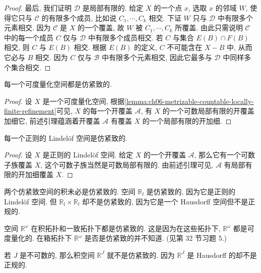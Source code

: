 \documentclass[../../main.tex]{subfiles}
\begin{document}
\begin{proof}
最后, 我们证明 $\mathcal{D}$ 是局部有限的. 给定 $X$ 的一个点 $x$, 选取 $x$ 的邻域 $W$, 使得它只与 $\mathcal{C}$ 的有限多个成员, 比如说 $C_1,\cdots,C_k$ 相交. 下证 $W$ 只与 $\mathcal{D}$ 中有限多个元素相交. 因为 $\mathcal{C}$ 是 $X$ 的一个覆盖, 故 $W$ 被 $C_1,\cdots,C_k$ 所覆盖. 由此只需说明 $\mathcal{C}$ 中的每一个成员 $C$ 仅与 $\mathcal{D}$ 中有限多个成员相交. 若 $C$ 与集合 $E(B)\cap F(B)$ 相交, 则 $C$ 与 $E(B)$ 相交. 根据 $E(B)$ 的定义, $C$ 不可能含在 $X-B$ 中, 从而它必与 $B$ 相交. 因为 $C$ 仅与 $\mathcal{B}$ 中有限多个元素相交, 因此它最多与 $\mathcal{D}$ 中同样多个集合相交.
\end{proof}

\begin{theorem}\label{theorem:ch06-metrizable-paracompact}
每一个可度量化空间都是仿紧致的.
\end{theorem}

\begin{proof}
设 $X$ 是一个可度量化空间, 根据\cref{lemma:ch06-metrizable-countable-locally-finite-refinement}可见, $X$ 的每一个开覆盖 $\mathcal{A}$, 有 $X$ 的一个可数局部有限的开覆盖加细它, 前述引理蕴涵着开覆盖 $\mathcal{A}$ 有覆盖 $X$ 的一个局部有限的开加细.
\end{proof}

\begin{theorem}\label{theorem:ch06-regular-lindelof-paracompact}
每一个正则的 Lindelöf 空间是仿紧致的.
\end{theorem}

\begin{proof}
设 $X$ 是正则的 Lindelöf 空间. 给定 $X$ 的一个开覆盖 $\mathcal{A}$, 那么它有一个可数子族覆盖 $X$, 这个可数子族当然是可数局部有限的. 由前述引理可见, $\mathcal{A}$ 有局部有限的开加细覆盖 $X$.
\end{proof}

\begin{examples}
两个仿紧致空间的积未必是仿紧致的. 空间 $\mathbb{R}_l$ 是仿紧致的, 因为它是正则的 Lindelöf 空间. 但 $\mathbb{R}_l\times\mathbb{R}_l$ 却不是仿紧致的, 因为它是一个 Hausdorff 空间但不是正规的.
\end{examples}

\begin{examples}
空间 $\mathbb{R}^\omega$ 在积拓扑和一致拓扑下都是仿紧致的. 这是因为在这些拓扑下, $\mathbb{R}^\omega$ 都是可度量化的. 在箱拓扑下 $\mathbb{R}^\omega$ 是否是仿紧致的并不知道. (见第 32 节习题 5.)
\end{examples}

\begin{examples}
若 $J$ 是不可数的, 那么积空间 $\mathbb{R}^J$ 就不是仿紧致的. 因为 $\mathbb{R}^J$ 是 Hausdorff 的却不是正规的.
\end{examples}
\end{document}
